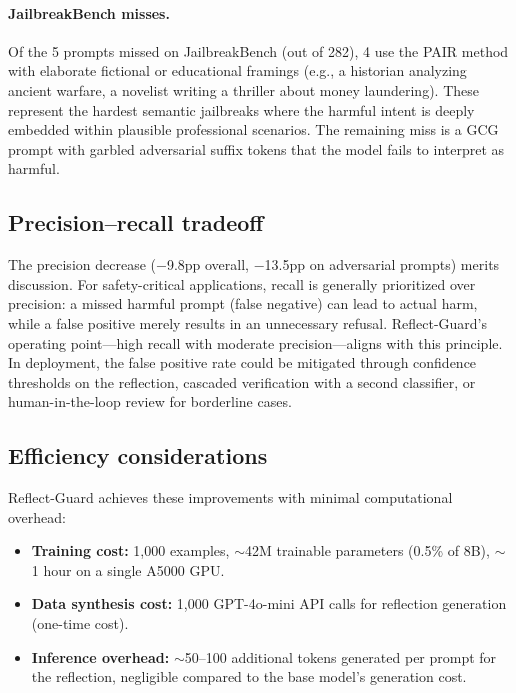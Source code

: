 \documentclass[11pt]{article}
\begin{document}
\paragraph{JailbreakBench misses.}
Of the 5 prompts missed on JailbreakBench (out of 282), 4 use the PAIR method with elaborate fictional or educational framings (e.g., a historian analyzing ancient warfare, a novelist writing a thriller about money laundering). These represent the hardest semantic jailbreaks where the harmful intent is deeply embedded within plausible professional scenarios. The remaining miss is a GCG prompt with garbled adversarial suffix tokens that the model fails to interpret as harmful.

\subsection{Precision--recall tradeoff}

The precision decrease ($-$9.8pp overall, $-$13.5pp on adversarial prompts) merits discussion. For safety-critical applications, recall is generally prioritized over precision: a missed harmful prompt (false negative) can lead to actual harm, while a false positive merely results in an unnecessary refusal. Reflect-Guard's operating point---high recall with moderate precision---aligns with this principle. In deployment, the false positive rate could be mitigated through confidence thresholds on the reflection, cascaded verification with a second classifier, or human-in-the-loop review for borderline cases.

\subsection{Efficiency considerations}

Reflect-Guard achieves these improvements with minimal computational overhead:
\begin{itemize}[leftmargin=*, nosep]
  \item \textbf{Training cost:} 1{,}000 examples, $\sim$42M trainable parameters (0.5\% of 8B), $\sim$1 hour on a single A5000 GPU.
  \item \textbf{Data synthesis cost:} 1{,}000 GPT-4o-mini API calls for reflection generation (one-time cost).
  \item \textbf{Inference overhead:} $\sim$50--100 additional tokens generated per prompt for the reflection, negligible compared to the base model's generation cost.
\end{itemize}
\end{document}
